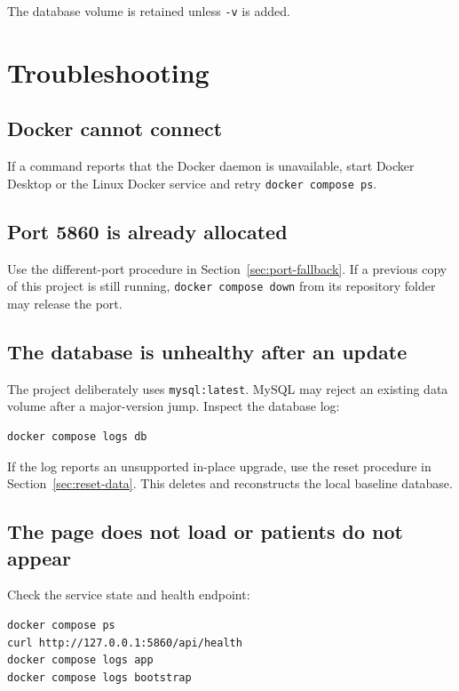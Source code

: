 \documentclass[11pt,a4paper]{article}
\begin{document}
The database volume is retained unless \texttt{-v} is added.

\section{Troubleshooting}

\subsection{Docker cannot connect}

If a command reports that the Docker daemon is unavailable, start Docker
Desktop or the Linux Docker service and retry \texttt{docker compose ps}.

\subsection{Port 5860 is already allocated}

Use the different-port procedure in Section~\ref{sec:port-fallback}. If a
previous copy of this project is still running, \texttt{docker compose down}
from its repository folder may release the port.

\subsection{The database is unhealthy after an update}

The project deliberately uses \texttt{mysql:latest}. MySQL may reject an
existing data volume after a major-version jump. Inspect the database log:

\begin{lstlisting}[style=terminal]
docker compose logs db
\end{lstlisting}

If the log reports an unsupported in-place upgrade, use the reset procedure
in Section~\ref{sec:reset-data}. This deletes and reconstructs the local
baseline database.

\subsection{The page does not load or patients do not appear}

Check the service state and health endpoint:

\begin{lstlisting}[style=terminal]
docker compose ps
curl http://127.0.0.1:5860/api/health
docker compose logs app
docker compose logs bootstrap
\end{lstlisting}
\end{document}
